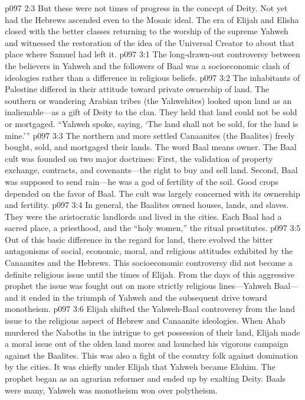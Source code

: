 \vs p097 2:3 But these were not times of progress in the concept of Deity. Not yet had the Hebrews ascended even to the Mosaic ideal. The era of Elijah and Elisha closed with the better classes returning to the worship of the supreme Yahweh and witnessed the restoration of the idea of the Universal Creator to about that place where Samuel had left it.
\vs p097 3:1 The long\hyp{}drawn\hyp{}out controversy between the believers in Yahweh and the followers of Baal was a socioeconomic clash of ideologies rather than a difference in religious beliefs.
\pc \vs p097 3:2 The inhabitants of Palestine differed in their attitude toward private ownership of land. The southern or wandering Arabian tribes (the Yahwehites) looked upon land as an inalienable---as a gift of Deity to the clan. They held that land could not be sold or mortgaged. “Yahweh spoke, saying, ‘The land shall not be sold, for the land is mine.’”
\vs p097 3:3 The northern and more settled Canaanites (the Baalites) freely bought, sold, and mortgaged their lands. The word Baal means owner. The Baal cult was founded on two major doctrines: First, the validation of property exchange, contracts, and covenants---the right to buy and sell land. Second, Baal was supposed to send rain---he was a god of fertility of the soil. Good crops depended on the favor of Baal. The cult was largely concerned with  its ownership and fertility.
\vs p097 3:4 In general, the Baalites owned houses, lands, and slaves. They were the aristocratic landlords and lived in the cities. Each Baal had a sacred place, a priesthood, and the “holy women,” the ritual prostitutes.
\vs p097 3:5 Out of this basic difference in the regard for land, there evolved the bitter antagonisms of social, economic, moral, and religious attitudes exhibited by the Canaanites and the Hebrews. This socioeconomic controversy did not become a definite religious issue until the times of Elijah. From the days of this aggressive prophet the issue was fought out on more strictly religious lines---Yahweh  Baal---and it ended in the triumph of Yahweh and the subsequent drive toward monotheism.
\vs p097 3:6 Elijah shifted the Yahweh\hyp{}Baal controversy from the land issue to the religious aspect of Hebrew and Canaanite ideologies. When Ahab murdered the Naboths in the intrigue to get possession of their land, Elijah made a moral issue out of the olden land mores and launched his vigorous campaign against the Baalites. This was also a fight of the country folk against domination by the cities. It was chiefly under Elijah that Yahweh became Elohim. The prophet began as an agrarian reformer and ended up by exalting Deity. Baals were many, Yahweh was monotheism won over polytheism.\plusone\plusone
